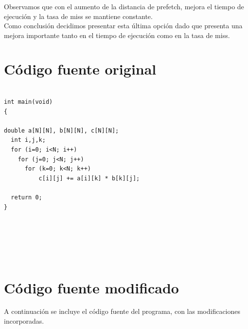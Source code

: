 \documentclass[a4paper,10pt]{article}
\begin{document}
Observamos que con el aumento de la distancia de prefetch, mejora el tiempo de ejecuci\'on y la tasa de miss se mantiene constante.\\

Como conclusi\'on decidimos presentar esta \'ultima opci\'on dado que presenta una mejora importante tanto en el tiempo de ejecuci\'on como en la tasa de miss.











\pagebreak
\section{C\'odigo fuente original} 
\begin{verbatim}

int main(void)
{

double a[N][N], b[N][N], c[N][N];
  int i,j,k;
  for (i=0; i<N; i++)
    for (j=0; j<N; j++)
      for (k=0; k<N; k++)
          c[i][j] += a[i][k] * b[k][j];

  return 0;
}


 



\end{verbatim}

\section{C\'odigo fuente modificado} 

A continuaci\'on se incluye el c\'odigo fuente del programa, con las modificaciones incorporadas.
\end{document}
